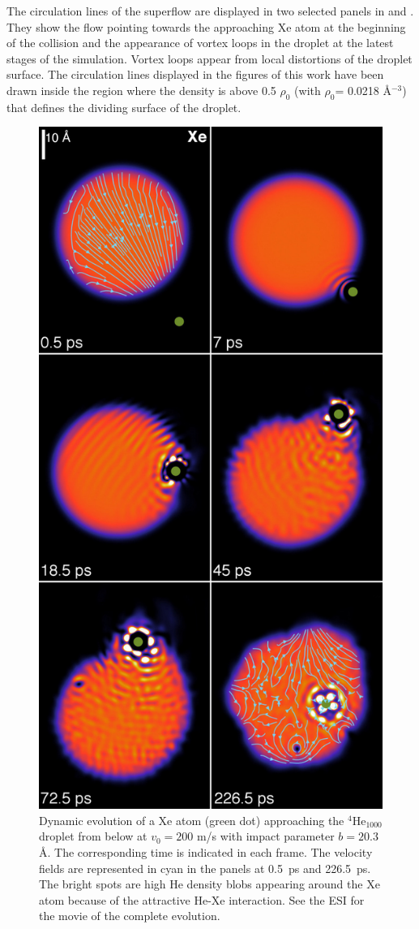  The circulation lines of the superflow are displayed 
in two selected panels in  and . 
They show the flow  pointing towards
the approaching Xe atom at the beginning of the collision and the appearance of vortex loops  
in the droplet at the latest stages of the simulation.
Vortex loops appear  from local distortions of the droplet surface\citep{Lea14b}. 
The circulation lines  displayed  in the figures of this work have been drawn inside the region where the density is above  0.5 $\rho_0$ (with $\rho_0$= 0.0218 \AA$^{-3}$)
 that defines the dividing surface of the droplet. 

\begin{figure}[h]
\centerline{\includegraphics[width=0.60\linewidth,clip]{xehe200-b203-composed}}
\caption{\label{fig5-capture} 
Dynamic evolution of a Xe atom (green dot) approaching the $^4$He$_{1000}$ 
droplet from below at $v_0 = 200$ m/s with impact parameter $b = 20.3$ \AA{}. The corresponding time is indicated in each frame. The velocity fields are represented in cyan in the panels at 0.5~ps and 226.5~ps. The bright spots are high He density blobs appearing around the Xe atom because of the attractive He-Xe interaction. See the ESI\citep{Coppens2017-2} for the movie of the complete evolution. 
}
\end{figure}
%

